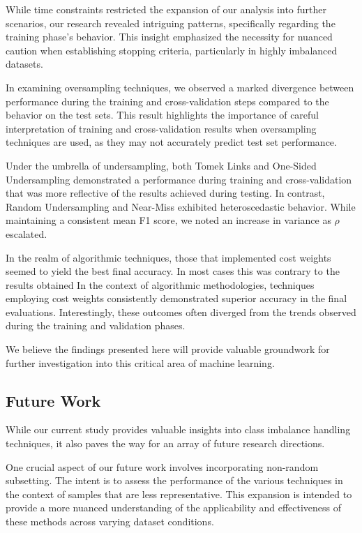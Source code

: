 \documentclass[journal]{IEEEtran}
\begin{document}
	While time constraints restricted the expansion of our analysis into further scenarios, our research revealed intriguing patterns, specifically regarding the training phase's behavior. This insight emphasized the necessity for nuanced caution when establishing stopping criteria, particularly in highly imbalanced datasets.
	
	In examining oversampling techniques, we observed a marked divergence between performance during the training and cross-validation steps compared to the behavior on the test sets. This result highlights the importance of careful interpretation of training and cross-validation results when oversampling techniques are used, as they may not accurately predict test set performance.
	
	Under the umbrella of undersampling, both Tomek Links and One-Sided Undersampling demonstrated a performance during training and cross-validation that was more reflective of the results achieved during testing. In contrast, Random Undersampling and Near-Miss exhibited heteroscedastic behavior. While maintaining a consistent mean F1 score, we noted an increase in variance as $\rho$ escalated.
	
	In the realm of algorithmic techniques, those that implemented cost weights seemed to yield the best final accuracy. In most cases this was contrary to the results obtained In the context of algorithmic methodologies, techniques employing cost weights consistently demonstrated superior accuracy in the final evaluations. Interestingly, these outcomes often diverged from the trends observed during the training and validation phases.
	
	We believe the findings presented here will provide valuable groundwork for further investigation into this critical area of machine learning.
	
	
	\subsection{Future Work}
	
	While our current study provides valuable insights into class imbalance handling techniques, it also paves the way for an array of future research directions.
	
	One crucial aspect of our future work involves incorporating non-random subsetting. The intent is to assess the performance of the various techniques in the context of samples that are less representative. This expansion is intended to provide a more nuanced understanding of the applicability and effectiveness of these methods across varying dataset conditions.
	
\end{document}
